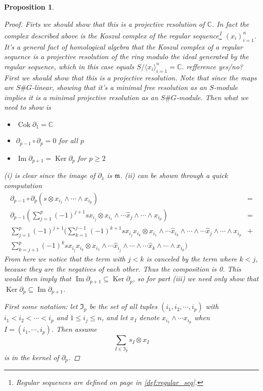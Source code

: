 \documentclass[11pt, a4paper, english]{article}
\newtheorem{prop}{Proposition}
\numberwithin{prop}{section}
\numberwithin{lemma}{section}
\numberwithin{theorem}{section}
\numberwithin{defin}{section}
\numberwithin{example}{section}
\newcommand{\C}{\mathbb{C}}
\DeclareMathOperator{\Image}{Im}
\DeclareMathOperator{\Ker}{Ker}
\DeclareMathOperator{\Cok}{Cok}
\begin{document}
\begin{prop}
\begin{proof}
Firts we should show that this is a projective resolution of $\C$. In fact the complex described above is the Koszul complex of the regular sequence\footnote{Regular sequences are defined on page \pageref{def:regular_seq} in \cref{def:regular_seq}.} $(x_i)_{i=1}^n$. It's a general fact of homological algebra that the Koszul complex of a regular sequence is a projective resolution of the ring modulo the ideal generated by the regular sequence, which in this case equals $S/\langle x_i \rangle_{i=1}^n = \C$. {\color{red} refference yes/no?}
\iffalse
First we should show that this is a projective resolution. Note that since the maps are $S\#G$-linear, showing that it's a minimal free resolution as an $S$-module implies it is a minimal projective resolution as an $S\#G$-module. Then what we need to show is 
\begin{itemize}
\item[(i)] $\Cok \partial_1 = \C$
\item[(ii)] $\partial_{p-1} \circ \partial_{p} = 0$ for all $p$
\item[(iii)] $\Image \partial_{p+1} = \Ker \partial_p$ for $p \geq 2$
\end{itemize}
(i) is clear since the image of $\partial_1$ is $\mathfrak{m}$. (ii) can be shown through a quick computation
\begin{align*}
\partial_{p-1} \circ \partial_{p}(s \otimes x_{i_1} \wedge \cdots \wedge x_{i_p}) &=\\ 
\partial_{p-1} \left(\sum_{j=1}^p (-1)^{j+1} sx_{i_j} \otimes x_{i_1} \wedge \cdots \hat{x}_j \wedge \cdots \wedge x_{i_p} \right)&=\\
\sum_{j=1}^p (-1)^{j+1} \Bigg(\sum_{k=1}^{j-1} (-1)^{k+1} sx_{i_j}x_{i_k} \otimes x_{i_1}\wedge \cdots \hat{x}_{i_k} \wedge \cdots \wedge \cdots \hat{x}_j \wedge \cdots \wedge x_{i_p}& +\\
\sum_{k=j+1}^{p} (-1)^k sx_{i_j}x_{i_k} \otimes x_{i_1}\wedge \cdots \hat{x}_{i_j} \wedge \cdots \wedge \cdots \hat{x}_k \wedge \cdots \wedge x_{i_p}\Bigg) &
\end{align*}
From here we notice that the term with $j < k$ is canceled by the term where $k < j$, because they are the negatives of each other. Thus the composition is 0. This would then imply that $\Image \partial_{p+1} \subseteq \Ker \partial_p$, so for part (iii) we need only show that $\Ker \partial_p \subseteq \Image \partial_{p+1}$.

First some notation: let $\mathfrak{I}_p$ be the set of all tuples $(i_1, i_2, \cdots, i_p)$ with $i_1 < i_2 < \cdots < i_p$ and $1 \leq i_j \leq n$, and let $x_I$ denote $x_{i_1} \wedge \cdots x_{i_p}$ when $I=(i_1, \cdots, i_p)$. Then assume $$ \sum_{I \in \mathfrak{I}_p} s_I \otimes x_I$$ is in the kernel of $\partial_p$. 



\end{proof}
\end{prop}
\end{document}
